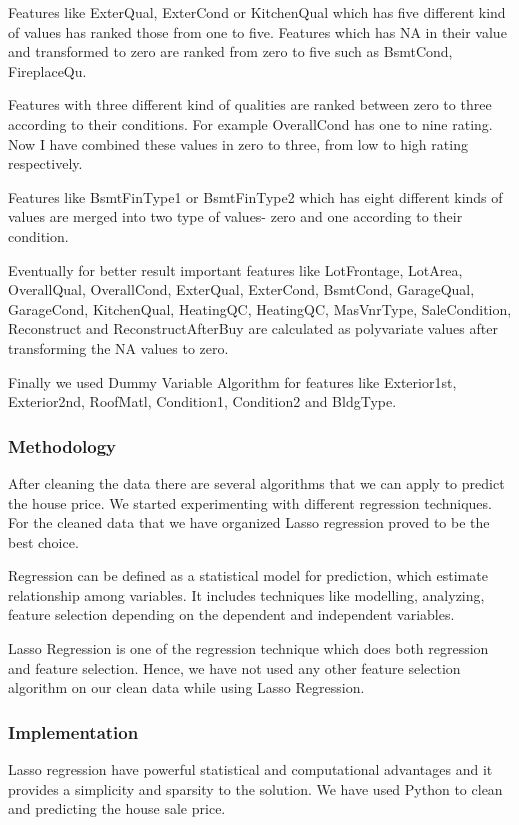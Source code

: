 \documentclass[fleqn,10pt]{SelfArx} %
\begin{document}
Features like ExterQual, ExterCond or KitchenQual which has five different kind of values has ranked those from one to five. Features which has NA in their value and transformed to zero are ranked from zero to five such as BsmtCond, FireplaceQu.

Features with three different kind of qualities are ranked between zero to three according to their conditions. For example OverallCond has one to nine rating. Now I have combined these values in zero to three, from low to high rating respectively.

Features like BsmtFinType1 or BsmtFinType2 which has eight different kinds of values are merged into two type of values- zero and one according to their condition.

Eventually for better result important features like LotFrontage,	LotArea, OverallQual, OverallCond, ExterQual, ExterCond, BsmtCond, GarageQual, GarageCond, KitchenQual, HeatingQC, HeatingQC, MasVnrType, SaleCondition, Reconstruct and ReconstructAfterBuy are calculated as polyvariate values after transforming the NA values to zero.

Finally we used Dummy Variable Algorithm for features like Exterior1st, Exterior2nd, RoofMatl, Condition1, Condition2 and BldgType. 

\subsubsection{Methodology}

After cleaning the data there are several algorithms that we can apply to predict the house price. We started experimenting with different regression techniques. For the cleaned data that we have organized Lasso regression proved to be the best choice. 

Regression\cite{wiki:regression} can be defined as a statistical model for prediction, which estimate relationship among variables. It includes techniques like modelling, analyzing, feature selection depending on the dependent and independent variables.

Lasso Regression is one of the regression technique which does both regression and feature selection. Hence, we have not used any other feature selection algorithm on our clean data while using Lasso Regression.

\subsubsection{Implementation}
Lasso regression have powerful statistical and computational advantages and it provides a simplicity and sparsity to the solution. 
We have used Python to clean and predicting the house sale price. 
\end{document}
